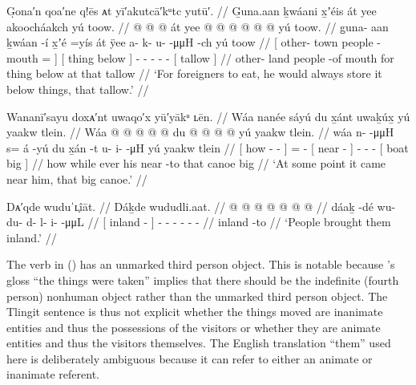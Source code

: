 \ex\label{ex:92-5-put-away-tallow}%
%
\begingl
	\glpreamble	G̣ona′n qoa′ne q!ēs ᴀt yī′akutcā′kᵘtc yutū′. //
	\glpreamble	G̱una.aan ḵwáani x̱ʼéis át yee akoocháakch yú toow. //
	\gla	{}  @ {}  @ {}  @ {} {}
			{} át yee @ {} {}
		 @ {} @ {} @ {} @ {} @ {}
		{} yú toow. {} //
	\glb	{} g̱una- aan ḵwáan -í x̱ʼé =yís {} 
			{} át ÿee {} {}
		a- k- u-  -μμH -ch
		{} yú toow {} //
	\glc	{}[ other- town people - mouth = {}]
			{}[ thing below \· {}]
		- - -  - -
		{}[  tallow {}] //
	\gld	{} other- land people -of mouth \•for {}
			{} thing below \·at {}
		 {} {} {} {} {}
		{} that tallow {} //
	\glft	‘For foreigners to eat, he would always store it below things, that tallow.’
		//
\endgl
\xe

\ex\label{ex:92-6-big-canoe-came-near}%
%
\begingl
	\glpreamble	Wananī′sayu doxᴀ′nt uwaqo′x yū′yākᵘ ʟēn. //
	\glpreamble	Wáa nanée sáyú du x̱ánt uwaḵúx̱ yú yaakw tlein. //
	\gla	{} Wáa  @ {} @ {} @ {} {}
		 @ {} @ {}
		{} du  @ {} {}
		 @ {} @ {} @ {}
		{} yú yaakw tlein. {} //
	\glb	{} wáa n-  -μμH {} {} 
		s= á -yú
		{} du x̱án -t {}
		u- i-  -μH
		{} yú yaakw tlein {} //
	\glc	{}[ how -  - \· {}]
		=  -
		{}[  near - {}]
		- -  -
		{}[  boat big {}] //
	\gld	{} how  {} {} \·while {}
		ever\·  {}
		{} his near -to {}
		 {} {} {}
		{} that canoe big {} //
	\glft	‘At some point it came near him, that big canoe.’
		//
\endgl
\xe

\ex\label{ex:92-7-ppl-brought-them-inland}%
%
\begingl
	\glpreamble	Dᴀ′qde wuduˈʟ̣îāt. //
	\glpreamble	Dáḵde wududli.aat. //
	\gla	{}  @ {} {}  @ {} @ {} @ {} @ {} @ {} @ {} //
	\glb	{} dáaḵ -dé {} wu- du- d- l- i-  -μμL //
	\glc	{}[ inland - {}]
		- - - - -
			 - //
	\gld	{} inland -to {}  {} {} {} {} {} {} //
	\glft	‘People brought them inland.’
		//
\endgl
\xe

The verb in (\lastx) has an unmarked third person object.
This is notable because \citeauthor{swanton:1909}’s gloss “the things were taken” implies that there should be the indefinite (fourth person) nonhuman object  rather than the unmarked third person object.
The Tlingit sentence is thus not explicit whether the things moved are inanimate entities and thus the possessions of the visitors or whether they are animate entities and thus the visitors themselves.
The English translation “them” used here is deliberately ambiguous because it can refer to either an animate or inanimate referent.

